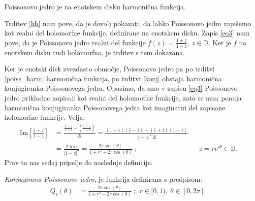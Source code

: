 \documentclass[mat1]{fmfdelo}
\begin{document}
    \begin{trditev}
        \label{poiss_harm}
        Poissonovo jedro je na enotskem disku harmonična funkcija. 
    \end{trditev}
    \begin{dokaz}
        Trditev \ref{hh} nam pove, da je dovolj pokazati, da lahko Poissonovo jedro zapišemo kot realni del holomorfne funkcije, definirane na enotskem disku.
        Zapis \eqref{eq3} nam pove, da je Poissonovo jedro realni del funkcije $f(z) = \frac{1 + z}{1 - z},~z \in \mathbb{D}$. Ker je $f$ na enotskem disku tudi holomorfna, je trditev s tem dokazana. 
    \end{dokaz}

    Ker je enotski disk zvezdasto območje, Poissonovo jedro pa po trditvi \ref{poiss_harm} harmonična funkcija, po trditvi \ref{konj} obstaja harmonična konjugiranka Poissonovega jedra. 
    Opazimo, da smo v zapisu \eqref{eq3} Poissonovo jedro prikladno zapisali kot realni del holomorfne funkcije, zato se nam ponuja harmonična konjugiranka Poissonovega jedra kot imaginarni del zapisane holomorfne funkcije.
    Velja:
    \begin{align*}
        \text{Im}\left[\frac{1 + z}{1-z}\right] &= \frac{\frac{1 + z}{1-z} - \left(\overline{\frac{1 + z}{1-z}}\right)}{2i} = \frac{(1 + z)(1 - \overline{z}) - (1 + \overline{z})(1 - z)}{|1 - z|^2~2i} & & \\ 
        & = \frac{2~\text{Im}z}{|1 - z|^2} = \frac{2 r \sin(\theta)}{1+ r^2 - 2r \cos(\theta)}~; & & z = r e^{i\theta} \in \mathbb{D}.
    \end{align*}
    Prav to nas sedaj pripelje do naslednje definicije. 
    \begin{definicija}
        \emph{Konjugirano Poissonovo jedro}, je funkcija definirana s predpisom:
        \begin{align}
            Q_r(\theta) & = \frac{2 r \sin(\theta)}{1+ r^2 - 2r \cos(\theta)}~;~~r \in [0,1),~\theta \in [0,2\pi].
        \end{align}
    \end{definicija}

\end{document}

